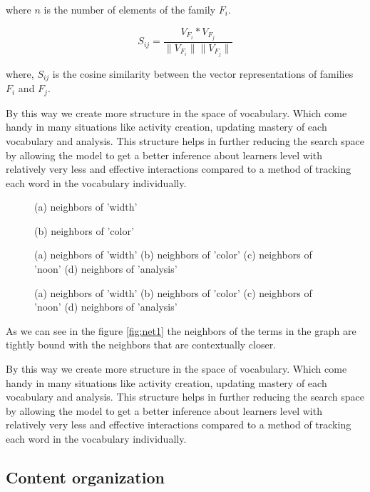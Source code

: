 \documentclass[11pt,a4paper]{article}
\begin{document}
where ${n}$ is the number of elements of the family ${F_i}$.

\begin{equation}
  S_{ij} = \frac{V_{F_i} * V_{F_j}}{\|V_{F_i}\|  \|V_{F_j}\|}
\end{equation}

where, ${S_{ij}}$ is the cosine similarity between the vector representations of
families ${F_i}$ and ${F_j}$.


By this way we create more structure in the space of vocabulary. Which come
handy in many situations like activity creation, updating mastery of each
vocabulary and analysis. This structure helps in further reducing the search space
by allowing the model to get a better inference about learners level with
relatively very less and effective interactions compared to a method of
tracking each word in the vocabulary individually.

\begin{figure}
\begin{tcbraster}[raster columns=1, enhanced, blankest]
\caption{(a) neighbors of 'width' }

\caption{ (b) neighbors of 'color' }


\caption{(a) neighbors of 'width'  (b) neighbors of 'color'  (c) neighbors of 'noon'  (d) neighbors of 'analysis'}
\end{tcbraster}
\caption{(a) neighbors of 'width'  (b) neighbors of 'color'  (c) neighbors of 'noon'  (d) neighbors of 'analysis'}
\end{figure}

As we can see in the figure \ref{fig:net1} the neighbors of the terms in the
graph are tightly bound with the neighbors that are contextually closer.

By this way we create more structure in the space of vocabulary. Which come
handy in many situations like activity creation, updating mastery of each
vocabulary and analysis. This structure helps in further reducing the search space
by allowing the model to get a better inference about learners level with
relatively very less and effective interactions compared to a method of
tracking each word in the vocabulary individually.


\subsection{Content organization}
\end{document}
